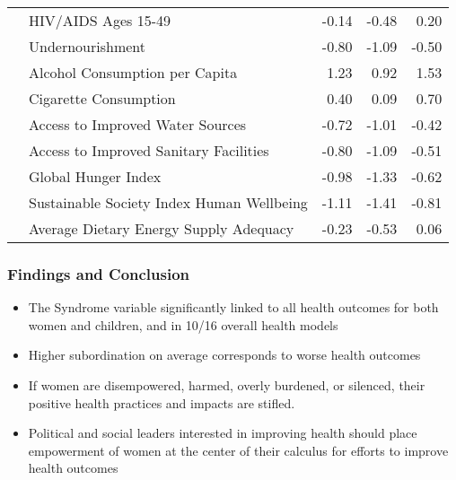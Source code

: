 \documentclass{beamer}
\begin{document}
\begin{frame}
\begin{table}[htb]
\begin{tabular}{l|l|r|r|r}
     & HIV/AIDS Ages 15-49  & -0.14 & -0.48 & 0.20 \\ 
     & Undernourishment  & -0.80 & -1.09 & -0.50 \\     
     & Alcohol Consumption per Capita  & 1.23 & 0.92 & 1.53 \\ 
     & Cigarette Consumption  &  0.40 & 0.09 & 0.70 \\
     & Access to Improved Water Sources  & -0.72 & -1.01 & -0.42 \\
     & Access to Improved Sanitary Facilities  & -0.80 & -1.09 & -0.51 \\ 
     & Global Hunger Index  &  -0.98 & -1.33 & -0.62 \\ 
     & Sustainable Society Index Human Wellbeing  &  -1.11 & -1.41 & -0.81 \\ 
     & Average Dietary Energy Supply Adequacy  & -0.23 & -0.53 & 0.06 \\ 
    \end{tabular}
    \label{synest}
\end{table}
\end{frame}

\begin{frame}
\frametitle{Findings and Conclusion}
\begin{itemize}
\item The Syndrome variable significantly linked to all health outcomes for both women and children, and in 10/16 overall health models
\item Higher subordination on average corresponds to worse health outcomes
\item If women are disempowered, harmed, overly burdened, or silenced, their positive health practices and impacts are stifled. 
\item Political and social leaders interested in improving health should place empowerment of women at the center of their calculus for efforts to improve health outcomes
\end{itemize}
\end{frame}
\end{document}
